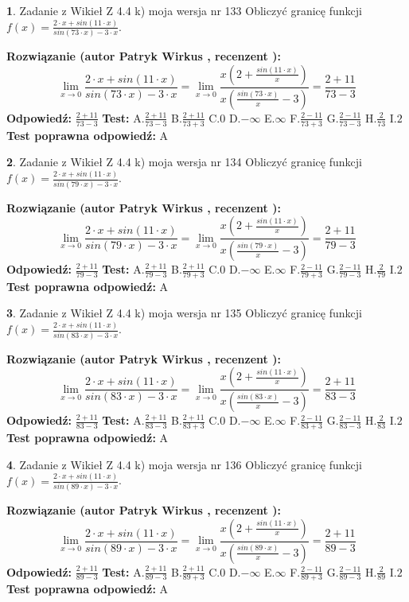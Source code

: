 \documentclass[12pt, a4paper]{article}
\theoremstyle{definition} %
\newtheorem{zad}{}
\newcommand{\zadStart}[1]{\begin{zad}#1\newline}
\newcommand{\zadStop}{\end{zad}}
\newcommand{\rozwStart}[2]{\noindent \textbf{Rozwiązanie (autor #1 , recenzent #2): }\newline}
\newcommand{\rozwStop}{\newline}
\newcommand{\odpStart}{\noindent \textbf{Odpowiedź:}\newline}
\newcommand{\odpStop}{\newline}
\newcommand{\testStart}{\noindent \textbf{Test:}\newline}
\newcommand{\testStop}{\newline}
\newcommand{\kluczStart}{\noindent \textbf{Test poprawna odpowiedź:}\newline}
\newcommand{\kluczStop}{\newline}
\begin{document}
\zadStart{Zadanie z Wikieł Z 4.4 k) moja wersja nr 133}
Obliczyć granicę funkcji $f(x)=\frac{2\cdot x +sin(11\cdot x)}{sin(73\cdot x) -3\cdot x}$.
\zadStop
\rozwStart{Patryk Wirkus}{}
$$\lim\limits_{x\to 0}\frac{2\cdot x +sin(11\cdot x)}{sin(73\cdot x) -3\cdot x}
=\lim\limits_{x\to 0}\frac{x(2+\frac{sin(11\cdot x)}{x})}{x(\frac{sin(73\cdot x)}{x}-3)}
=\frac{2+11}{73-3}$$
\rozwStop
\odpStart
$\frac{2+11}{73-3}$
\odpStop
\testStart
A.$\frac{2+11}{73-3}$
B.$\frac{2+11}{73+3}$
C.$0$
D.$-\infty$
E.$\infty$
F.$\frac{2-11}{73+3}$
G.$\frac{2-11}{73-3}$
H.$\frac{2}{73}$
I.$2$
\testStop
\kluczStart
A
\kluczStop



\zadStart{Zadanie z Wikieł Z 4.4 k) moja wersja nr 134}
Obliczyć granicę funkcji $f(x)=\frac{2\cdot x +sin(11\cdot x)}{sin(79\cdot x) -3\cdot x}$.
\zadStop
\rozwStart{Patryk Wirkus}{}
$$\lim\limits_{x\to 0}\frac{2\cdot x +sin(11\cdot x)}{sin(79\cdot x) -3\cdot x}
=\lim\limits_{x\to 0}\frac{x(2+\frac{sin(11\cdot x)}{x})}{x(\frac{sin(79\cdot x)}{x}-3)}
=\frac{2+11}{79-3}$$
\rozwStop
\odpStart
$\frac{2+11}{79-3}$
\odpStop
\testStart
A.$\frac{2+11}{79-3}$
B.$\frac{2+11}{79+3}$
C.$0$
D.$-\infty$
E.$\infty$
F.$\frac{2-11}{79+3}$
G.$\frac{2-11}{79-3}$
H.$\frac{2}{79}$
I.$2$
\testStop
\kluczStart
A
\kluczStop



\zadStart{Zadanie z Wikieł Z 4.4 k) moja wersja nr 135}
Obliczyć granicę funkcji $f(x)=\frac{2\cdot x +sin(11\cdot x)}{sin(83\cdot x) -3\cdot x}$.
\zadStop
\rozwStart{Patryk Wirkus}{}
$$\lim\limits_{x\to 0}\frac{2\cdot x +sin(11\cdot x)}{sin(83\cdot x) -3\cdot x}
=\lim\limits_{x\to 0}\frac{x(2+\frac{sin(11\cdot x)}{x})}{x(\frac{sin(83\cdot x)}{x}-3)}
=\frac{2+11}{83-3}$$
\rozwStop
\odpStart
$\frac{2+11}{83-3}$
\odpStop
\testStart
A.$\frac{2+11}{83-3}$
B.$\frac{2+11}{83+3}$
C.$0$
D.$-\infty$
E.$\infty$
F.$\frac{2-11}{83+3}$
G.$\frac{2-11}{83-3}$
H.$\frac{2}{83}$
I.$2$
\testStop
\kluczStart
A
\kluczStop



\zadStart{Zadanie z Wikieł Z 4.4 k) moja wersja nr 136}
Obliczyć granicę funkcji $f(x)=\frac{2\cdot x +sin(11\cdot x)}{sin(89\cdot x) -3\cdot x}$.
\zadStop
\rozwStart{Patryk Wirkus}{}
$$\lim\limits_{x\to 0}\frac{2\cdot x +sin(11\cdot x)}{sin(89\cdot x) -3\cdot x}
=\lim\limits_{x\to 0}\frac{x(2+\frac{sin(11\cdot x)}{x})}{x(\frac{sin(89\cdot x)}{x}-3)}
=\frac{2+11}{89-3}$$
\rozwStop
\odpStart
$\frac{2+11}{89-3}$
\odpStop
\testStart
A.$\frac{2+11}{89-3}$
B.$\frac{2+11}{89+3}$
C.$0$
D.$-\infty$
E.$\infty$
F.$\frac{2-11}{89+3}$
G.$\frac{2-11}{89-3}$
H.$\frac{2}{89}$
I.$2$
\testStop
\kluczStart
A
\kluczStop
\end{document}
